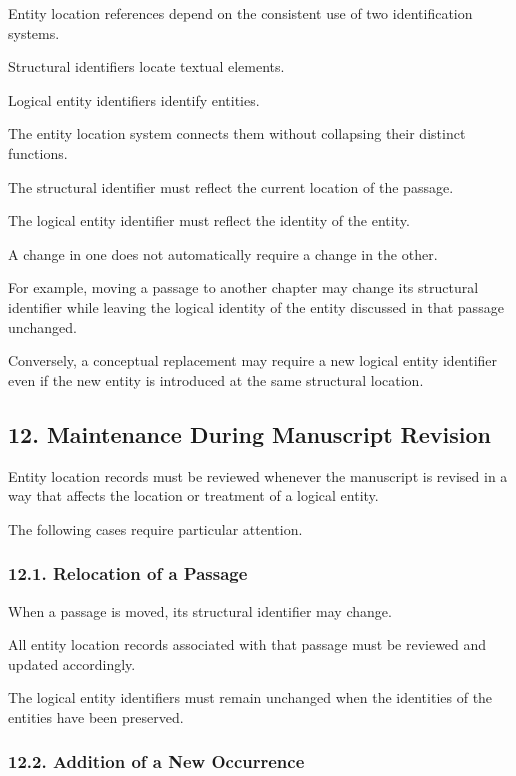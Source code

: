 Entity location references
depend on the consistent
use of two identification
systems.

Structural identifiers
locate textual elements.

Logical entity identifiers
identify entities.

The entity location system
connects them without
collapsing their distinct
functions.

The structural identifier
must reflect the current
location of the passage.

The logical entity identifier
must reflect the identity
of the entity.

A change in one does not
automatically require a
change in the other.

For example, moving a passage
to another chapter may
change its structural
identifier while leaving
the logical identity of
the entity discussed
in that passage unchanged.

Conversely, a conceptual
replacement may require
a new logical entity
identifier even if the
new entity is introduced
at the same structural
location.


\subsection*{12. Maintenance During
Manuscript Revision}

Entity location records
must be reviewed whenever
the manuscript is revised
in a way that affects
the location or treatment
of a logical entity.

The following cases require
particular attention.

\subsubsection*{12.1. Relocation of a Passage}

When a passage is moved,
its structural identifier
may change.

All entity location records
associated with that passage
must be reviewed and updated
accordingly.

The logical entity identifiers
must remain unchanged when
the identities of the entities
have been preserved.

\subsubsection*{12.2. Addition of a New Occurrence}

